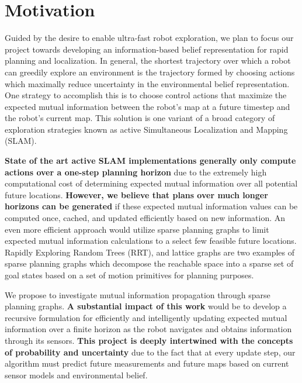 \section{Motivation}

Guided by the desire to enable ultra-fast robot exploration, we plan to focus our project towards developing an information-based belief representation for rapid planning and localization. In general, the shortest trajectory over which a robot can greedily explore an environment is the trajectory formed by choosing actions which maximally reduce uncertainty in the environmental belief representation. One strategy to accomplish this is to choose control actions that maximize the expected mutual information between the robot's map at a future timestep and the robot's current map. This solution is one variant of a broad category of exploration strategies known as active Simultaneous Localization and Mapping (SLAM).

{\bf State of the art active SLAM implementations generally only compute actions over a one-step planning horizon} due to the extremely high computational cost of determining expected mutual information over all potential future locations. {\bf However, we believe that plans over much longer horizons can be generated} if these expected mutual information values can be computed once, cached, and updated efficiently based on new information. An even more efficient approach would utilize sparse planning graphs to limit expected mutual information calculations to a select few feasible future locations. Rapidly Exploring Random Trees (RRT), and lattice graphs are two examples of sparse planning graphs which decompose the reachable space into a sparse set of goal states based on a set of motion primitives for planning purposes.

We propose to investigate mutual information propagation through sparse planning graphs. {\bf A substantial impact of this work} would be to develop a recursive formulation for efficiently and intelligently updating expected mutual information over a finite horizon as the robot navigates and obtains information through its sensors. {\bf This project is deeply intertwined with the concepts of probability and uncertainty} due to the fact that at every update step, our algorithm must predict future measurements and future maps based on current sensor models and environmental belief.
